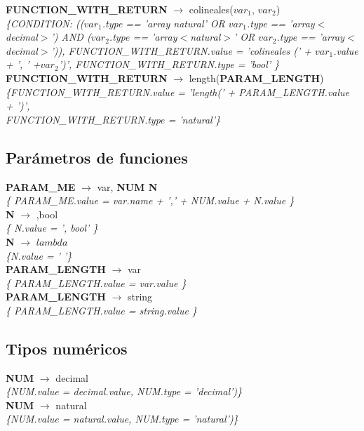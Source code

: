 \documentclass[10pt,a4paper]{article}
\begin{document}
\textbf{FUNCTION\_WITH\_RETURN} $\rightarrow$ colineales($var_{1}$, $var_{2}$)   \\
\textit{\{CONDITION: (($var_{1}$.type == 'array natural' OR $ var_{1}$.type == 'array$<$decimal$>$') AND
($var_{2}$.type == 'array$<$natural$>$' OR $var_{2}$.type == 'array$<$decimal$>$')), FUNCTION\_WITH\_RETURN.value =  'colineales (' + $var_{1}$.value + ', ' +$var_{2}$')', FUNCTION\_WITH\_RETURN.type = 'bool' \}} \\

\textbf{FUNCTION\_WITH\_RETURN} $\rightarrow$ length(\textbf{PARAM\_LENGTH}) \\
\textit{\{FUNCTION\_WITH\_RETURN.value =  'length(' + PARAM\_LENGTH.value + ')',\\ 
FUNCTION\_WITH\_RETURN.type = 'natural'\}} \\

\subsection{Parámetros de funciones}
\textbf{PARAM\_ME} $\rightarrow$ var, \textbf{NUM N} \\
\textit{\{ PARAM\_ME.value = var.name + ',' + NUM.value + N.value    \}} \\

\textbf{N} $\rightarrow$ ,bool \\
\textit{\{ N.value = ', bool'   \}} \\ 

\textbf{N} $\rightarrow$ $lambda$  \\
\textit{\{N.value = ' '\}} \\

\textbf{PARAM\_LENGTH} $\rightarrow$ var \\
\textit{\{ PARAM\_LENGTH.value = var.value    \}} \\

\textbf{PARAM\_LENGTH} $\rightarrow$ string \\
\textit{\{ PARAM\_LENGTH.value = string.value   \}} \\

\subsection{Tipos numéricos}
\textbf{NUM} $\rightarrow$ decimal \\
\textit{\{NUM.value = decimal.value, NUM.type = 'decimal')\}}  \\ 

\textbf{NUM} $\rightarrow$ natural \\
\textit{\{NUM.value = natural.value, NUM.type = 'natural')\}}  \\ 
\end{document}

